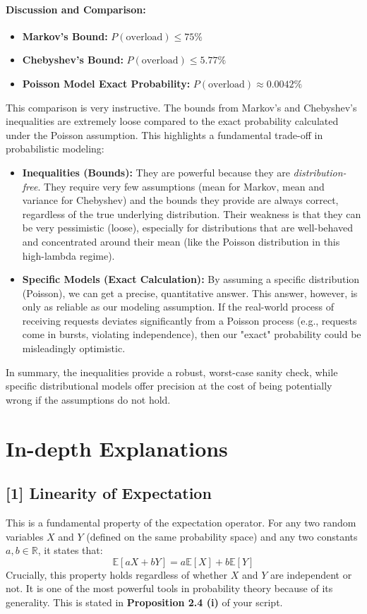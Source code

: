 \documentclass[11pt,a4paper]{article}
\begin{document}
\paragraph{Discussion and Comparison:}
\begin{itemize}
    \item \textbf{Markov's Bound:} $P(\text{overload}) \leq 75\%$
    \item \textbf{Chebyshev's Bound:} $P(\text{overload}) \leq 5.77\%$
    \item \textbf{Poisson Model Exact Probability:} $P(\text{overload}) \approx 0.0042\%$
\end{itemize}
This comparison is very instructive. The bounds from Markov's and Chebyshev's inequalities are extremely loose compared to the exact probability calculated under the Poisson assumption. This highlights a fundamental trade-off in probabilistic modeling:
\begin{itemize}
    \item \textbf{Inequalities (Bounds):} They are powerful because they are \textit{distribution-free}. They require very few assumptions (mean for Markov, mean and variance for Chebyshev) and the bounds they provide are always correct, regardless of the true underlying distribution. Their weakness is that they can be very pessimistic (loose), especially for distributions that are well-behaved and concentrated around their mean (like the Poisson distribution in this high-lambda regime).
    \item \textbf{Specific Models (Exact Calculation):} By assuming a specific distribution (Poisson), we can get a precise, quantitative answer. This answer, however, is only as reliable as our modeling assumption. If the real-world process of receiving requests deviates significantly from a Poisson process (e.g., requests come in bursts, violating independence), then our "exact" probability could be misleadingly optimistic.
\end{itemize}
In summary, the inequalities provide a robust, worst-case sanity check, while specific distributional models offer precision at the cost of being potentially wrong if the assumptions do not hold.

\newpage
\section{In-depth Explanations}

\hypertarget{concept1}{\subsection*{[1] Linearity of Expectation}}
This is a fundamental property of the expectation operator. For any two random variables $X$ and $Y$ (defined on the same probability space) and any two constants $a, b \in \mathbb{R}$, it states that:
\[ \mathbb{E}[aX + bY] = a\mathbb{E}[X] + b\mathbb{E}[Y] \]
Crucially, this property holds regardless of whether $X$ and $Y$ are independent or not. It is one of the most powerful tools in probability theory because of its generality. This is stated in \textbf{Proposition 2.4 (i)} of your script.
\end{document}
